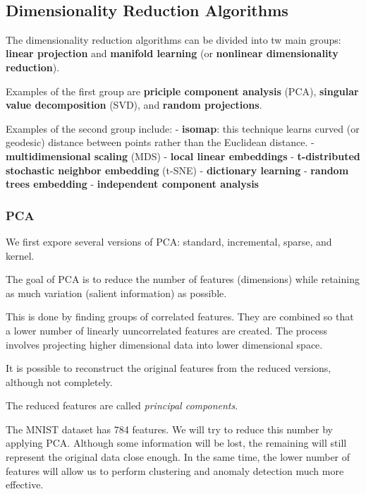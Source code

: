 \documentclass[11pt]{article}
\begin{document}
    \begin{center}
    \end{center}
    { \hspace*{\fill} \\}
    
    \subsection{Dimensionality Reduction
Algorithms}\label{dimensionality-reduction-algorithms}

The dimensionality reduction algorithms can be divided into tw main
groups: \textbf{linear projection} and \textbf{manifold learning} (or
\textbf{nonlinear dimensionality reduction}).

Examples of the first group are \textbf{priciple component analysis}
(PCA), \textbf{singular value decomposition} (SVD), and \textbf{random
projections}.

Examples of the second group include: - \textbf{isomap}: this technique
learns curved (or geodesic) distance between points rather than the
Euclidean distance. - \textbf{multidimensional scaling} (MDS) -
\textbf{local linear embeddings} - \textbf{t-distributed stochastic
neighbor embedding} (t-SNE) - \textbf{dictionary learning} -
\textbf{random trees embedding} - \textbf{independent component
analysis}

    \subsubsection{PCA}\label{pca}

We first expore several versions of PCA: standard, incremental, sparse,
and kernel.

The goal of PCA is to reduce the number of features (dimensions) while
retaining as much variation (salient information) as possible.

This is done by finding groups of correlated features. They are combined
so that a lower number of linearly uuncorrelated features are created.
The process involves projecting higher dimensional data into lower
dimensional space.

It is possible to reconstruct the original features from the reduced
versions, although not completely.

The reduced features are called \emph{principal components}.

The MNIST dataset has 784 features. We will try to reduce this number by
applying PCA. Although some information will be lost, the remaining will
still represent the original data close enough. In the same time, the
lower number of features will allow us to perform clustering and anomaly
detection much more effective.
\end{document}
